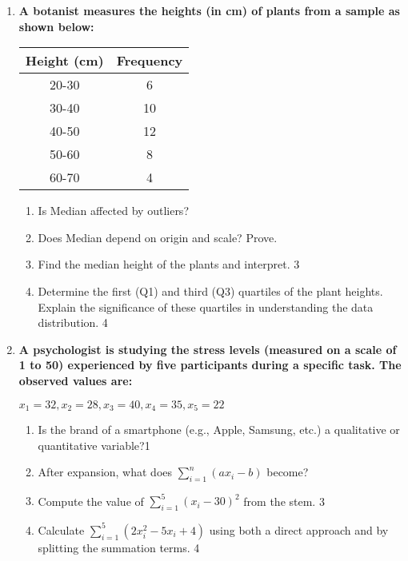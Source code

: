 \documentclass{article}
\begin{document}
\begin{enumerate}
\item
\textbf{A botanist measures the heights (in cm) of plants from a sample as 
shown below:}

\begin{table}[h]
\centering
\begin{tabular}{c|c}
\textbf{Height (cm)} & \textbf{Frequency} \\ \hline
20-30                & 6                  \\ \hline
30-40                & 10                 \\ \hline
40-50                & 12                 \\ \hline
50-60                & 8                  \\ \hline
60-70                & 4                  
\end{tabular}
\end{table}

\begin{enumerate}
\item Is Median affected by outliers?
\item Does Median depend on origin and scale? Prove.
    \item  
    Find the median height of the plants and interpret. \hfill 3
    \item
    Determine the first (Q1) and third (Q3) quartiles of the plant heights. \\
    Explain the significance of these quartiles in understanding the data 
    distribution. \hfill 4
\end{enumerate}

  \item
\textbf{A psychologist is studying the stress levels (measured on a scale 
of 1 to 50) experienced by five participants during a specific task. 
The observed values are:}
\begin{center}
$x_1 = 32, x_2 = 28, x_3 = 40, x_4 = 35, x_5 = 22$
\end{center}
\begin{enumerate}
\item Is the brand of a smartphone (e.g., Apple, Samsung, etc.) a 
qualitative or quantitative variable?\hfill 1
\item After expansion, what does $\displaystyle \sum_{i=1}^n 
\left( ax_i-b \right)$ become?
    \item
    Compute the value of $\displaystyle \sum_{i=1}^5 (x_i - 30)^2$ from the 
    stem. \hfill 3
    \item
    Calculate $\displaystyle \sum_{i=1}^5 (2x_i^2 - 5x_i + 4)$ using both a 
    direct approach and by splitting the summation terms. \hfill 4
\end{enumerate}


\end{enumerate}
\end{document}
